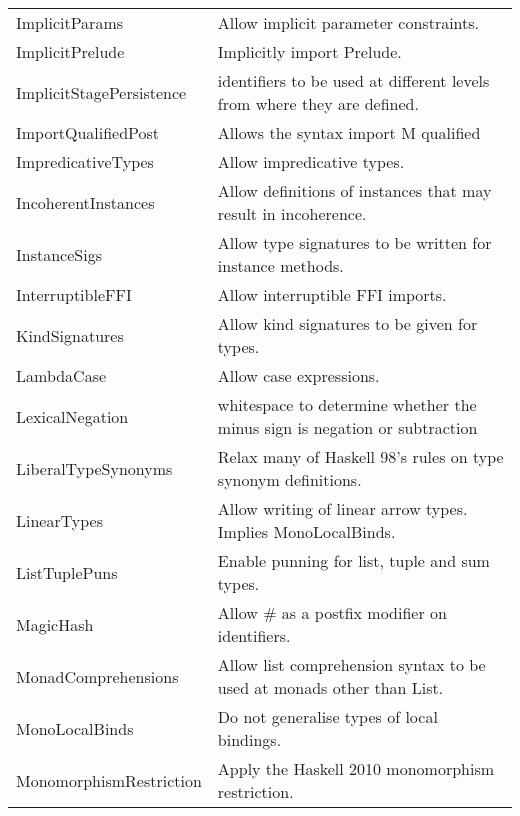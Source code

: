 \documentclass[openany, 12pt]{book}
\begin{document}
\begin{longtable}{ll}
	ImplicitParams             & Allow implicit parameter constraints.                                      \\
	ImplicitPrelude            & Implicitly import Prelude.                                                 \\
	ImplicitStagePersistence   & identifiers to be used at different levels from where they are defined.    \\
	ImportQualifiedPost        & Allows the syntax import M qualified                                       \\
	ImpredicativeTypes         & Allow impredicative types.                                                 \\
	IncoherentInstances        & Allow definitions of instances that may result in incoherence.             \\
	InstanceSigs               & Allow type signatures to be written for instance methods.                  \\
	InterruptibleFFI           & Allow interruptible FFI imports.                                           \\
	KindSignatures             & Allow kind signatures to be given for types.                               \\
	LambdaCase                 & Allow case expressions.                                                    \\
	LexicalNegation            & whitespace to determine whether the minus sign is negation or subtraction  \\
	LiberalTypeSynonyms        & Relax many of Haskell 98's rules on type synonym definitions.              \\
	LinearTypes                & Allow writing of linear arrow types. Implies MonoLocalBinds.               \\
	ListTuplePuns              & Enable punning for list, tuple and sum types.                              \\
	MagicHash                  & Allow \# as a postfix modifier on identifiers.                             \\
	MonadComprehensions        & Allow list comprehension syntax to be used at monads other than List.      \\
	MonoLocalBinds             & Do not generalise types of local bindings.                                 \\
	MonomorphismRestriction    & Apply the Haskell 2010 monomorphism restriction.                           \\

\end{longtable}
\end{document}
